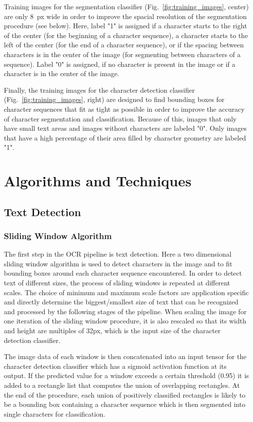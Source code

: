 \documentclass[11pt]{article}
\begin{document}
Training images for the segmentation classifier (Fig.~\ref{fig:training_images}, center) are only 8~px wide in order to improve the spacial resolution of the segmentation procedure (see below).
%
Here, label "1" is assigned if a character starts to the right of the center (for the beginning of a character sequence),
a character starts to the left of the center (for the end of a character sequence), or if the spacing
between characters is in the center of the image (for segmenting between characters of a sequence).
%
Label "0" is assigned, if no character is present in the image or if a character is in the center of the image.


Finally, the training images for the character detection classifier (Fig.~\ref{fig:training_images}, right) are
designed to find bounding boxes for character sequences that fit as tight as possible in order to improve
the accuracy of character segmentation and classification.
%
Because of this, images that only have small
text areas and images without characters are labeled "0".
%
Only images that have a high percentage of their area filled by character geometry are labeled "1".

\section{Algorithms and Techniques}
\subsection{Text Detection}
\subsubsection{Sliding Window Algorithm}
The first step in the OCR pipeline is text detection.
%
Here a two dimensional sliding window algorithm is used to detect characters in the image and to fit bounding boxes
around each character sequence encountered.
%
In order to detect text of different sizes, the process of sliding windows is repeated at different
scales.
%
The choice of minimum and maximum scale factors are application specific and directly determine the
biggest/smallest size of text that can be recognized and processed by the following stages of the
pipeline.
%
When scaling the image for one iteration of the sliding window procedure, it is also rescaled
so that its width and height are multiples of 32px, which is the input size of the character detection
classifier.

The image data of each window is then concatenated into an input tensor for the character detection
classifier which has a sigmoid activation function at its output.
%
If the predicted value for a window exceeds a certain threshold (0.95) it is added to a rectangle list that computes
the union of overlapping rectangles.
%
At the end of the procedure, each union of positively classified rectangles is likely to be a bounding
box containing a character sequence which is then segmented into single characters for classification.
\end{document}
